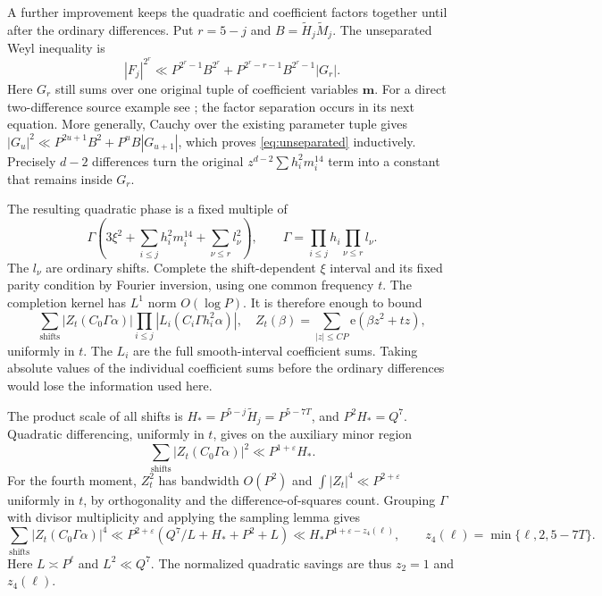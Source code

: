 \documentclass[11pt,letterpaper]{article}
\theoremstyle{remark}
\newcommand{\eps}{\varepsilon}
\newcommand{\e}{\mathrm e}
\begin{document}
A further improvement keeps the quadratic and coefficient factors together until
after the ordinary differences. Put $r=5-j$ and
$B=\widetilde H_j\widetilde M_j$. The unseparated Weyl inequality is
\begin{equation}\label{eq:unseparated}
 |F_j|^{2^r}\ll P^{2^r-1}B^{2^r}
            +P^{2^r-r-1}B^{2^r-1}|G_r|.
\end{equation}
Here $G_r$ still sums over one original tuple of coefficient variables $\mathbf m$.
For a direct two-difference source example see \cite[(12.17)]{VW95}; the factor
separation occurs in its next equation. More generally, Cauchy over the existing
parameter tuple gives
$|G_u|^2\ll P^{2u+1}B^2+P^uB|G_{u+1}|$, which proves
\eqref{eq:unseparated} inductively. Precisely $d-2$ differences turn the original
$z^{d-2}\sum h_i^2m_i^{14}$ term into a constant that remains inside $G_r$.

The resulting quadratic phase is a fixed multiple of
\[
 \Gamma\left(3\xi^2+\sum_{i\le j}h_i^2m_i^{14}
                         +\sum_{\nu\le r}l_\nu^2\right),\qquad
 \Gamma=\prod_{i\le j}h_i\prod_{\nu\le r}l_\nu.
\]
The $l_\nu$ are ordinary shifts. Complete the shift-dependent $\xi$ interval and
its fixed parity condition by Fourier inversion, using one common frequency $t$.
The completion kernel has $L^1$ norm $O(\log P)$. It is therefore enough to bound
\[
 \sum_{\text{shifts}}|Z_t(C_0\Gamma\alpha)|
              \prod_{i\le j}|L_i(C_i\Gamma h_i^2\alpha)|,
 \quad Z_t(\beta)=\sum_{|z|\le CP}\e(\beta z^2+tz),
\]
uniformly in $t$. The $L_i$ are the full smooth-interval coefficient sums.
Taking absolute values of the individual coefficient sums before the ordinary
differences would lose the information used here.

The product scale of all shifts is
$H_*=P^{5-j}\widetilde H_j=P^{5-7T}$, and $P^2H_*=Q^7$.
Quadratic differencing, uniformly in $t$, gives on the auxiliary minor region
\[
 \sum_{\text{shifts}}|Z_t(C_0\Gamma\alpha)|^2
       \ll P^{1+\eps}H_*.
\]
For the fourth moment, $Z_t^2$ has bandwidth $O(P^2)$ and
$\int|Z_t|^4\ll P^{2+\eps}$ uniformly in $t$, by orthogonality and the
difference-of-squares count. Grouping $\Gamma$ with divisor multiplicity and
applying the sampling lemma gives
\[
 \sum_{\text{shifts}}|Z_t(C_0\Gamma\alpha)|^4
 \ll P^{2+\eps}(Q^7/L+H_*+P^2+L)
 \ll H_*P^{4+\eps-z_4(\ell)},
 \qquad z_4(\ell)=\min\{\ell,2,5-7T\}.
\]
Here $L\asymp P^\ell$ and $L^2\ll Q^7$. The normalized quadratic savings are
thus $z_2=1$ and $z_4(\ell)$.
\end{document}
